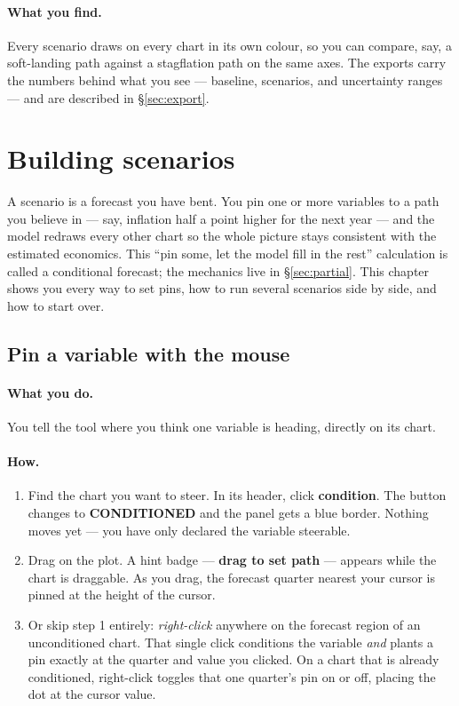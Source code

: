 \documentclass[11pt]{article}
\theoremstyle{definition}
\theoremstyle{remark}
\begin{document}
\paragraph{What you find.} Every scenario draws on every chart in its own colour, so you can
compare, say, a soft-landing path against a stagflation path on the same axes. The exports
carry the numbers behind what you see --- baseline, scenarios, and uncertainty ranges --- and
are described in \S\ref{sec:export}.

\section{Building scenarios}\label{sec:use-scenarios}

A scenario is a forecast you have bent. You pin one or more variables to a path you
believe in --- say, inflation half a point higher for the next year --- and the model
redraws every other chart so the whole picture stays consistent with the estimated
economics. This ``pin some, let the model fill in the rest'' calculation is called a
conditional forecast; the mechanics live in \S\ref{sec:partial}. This chapter shows
you every way to set pins, how to run several scenarios side by side, and how to
start over.

\subsection{Pin a variable with the mouse}

\paragraph{What you do.} You tell the tool where you think one variable is heading,
directly on its chart.

\paragraph{How.}
\begin{enumerate}
  \item Find the chart you want to steer. In its header, click \textbf{condition}.
    The button changes to \textbf{CONDITIONED} and the panel gets a blue border.
    Nothing moves yet --- you have only declared the variable steerable.
  \item Drag on the plot. A hint badge --- \textbf{drag to set path} --- appears while
    the chart is draggable. As you drag, the forecast quarter nearest your cursor is
    pinned at the height of the cursor.
  \item Or skip step 1 entirely: \emph{right-click} anywhere on the forecast region of
    an unconditioned chart. That single click conditions the variable \emph{and}
    plants a pin exactly at the quarter and value you clicked. On a chart that is
    already conditioned, right-click toggles that one quarter's pin on or off,
    placing the dot at the cursor value.
\end{enumerate}
\end{document}
